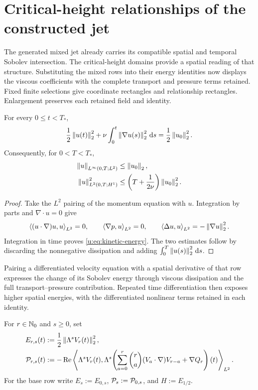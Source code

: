 \section{Critical-height relationships of the constructed jet}
\label{u:sec:compatible-rectangles}

The generated mixed jet already carries its compatible spatial and temporal
Sobolev intersection. The critical-height domains provide a spatial reading
of that structure. Substituting the mixed rows into their energy identities
now displays the viscous coefficients with the complete transport and
pressure terms retained. Fixed finite selections give coordinate rectangles
and relationship rectangles. Enlargement preserves each retained field and
identity.

\begin{proposition}
\label{u:prop:kinetic-energy}
For every \(0\le t<T_*\),
\begin{equation}
 \frac12\left\lVert u(t)\right\rVert_2^2
 +\nu\int_0^t\left\lVert \nabla u(s)\right\rVert_2^2\,\mathrm d s
 =\frac12\left\lVert u_0\right\rVert_2^2.
 \label{u:eq:kinetic-energy}
\end{equation}
Consequently, for \(0<T<T_*\),
\begin{align}
 \left\lVert u\right\rVert_{L^\infty(0,T;L^2)}&\le\left\lVert u_0\right\rVert_2,
 \label{u:eq:energy-Linf}\\
 \left\lVert u\right\rVert_{L^2(0,T;H^1)}^2
 &\le\left(T+\frac1{2\nu}\right)\left\lVert u_0\right\rVert_2^2.
 \label{u:eq:energy-L2H1}
\end{align}
\end{proposition}

\begin{proof}
Take the \(L^2\) pairing of the momentum equation with \(u\).  Integration
by parts and \(\nabla\cdot u=0\) give
\[
 \left\langle (u\cdot\nabla)u,u\right\rangle_{L^2}=0,
 \qquad
 \left\langle \nabla p,u\right\rangle_{L^2}=0,
 \qquad
 \left\langle \Delta u,u\right\rangle_{L^2}=-\left\lVert \nabla u\right\rVert_2^2.
\]
Integration in time proves \eqref{u:eq:kinetic-energy}.  The two estimates
follow by discarding the nonnegative dissipation and adding
\(\int_0^T\left\lVert u(s)\right\rVert_2^2\,\mathrm d s\).
\end{proof}

Pairing a differentiated velocity equation with a spatial derivative of
that row expresses the change of its Sobolev energy through viscous
dissipation and the full transport--pressure contribution.  Repeated time
differentiation then exposes higher spatial energies, with the differentiated
nonlinear terms retained in each identity.

\begin{definition}
\label{u:def:critical-height-rows}
For \(r\in\mathbb N_0\) and \(s\ge0\), set
\begin{align}
 E_{r,s}(t)&:=\frac12\left\lVert \Lambda^sV_r(t)\right\rVert_2^2,
 \label{u:eq:temporal-row-spatial-energy}\\
 \mathcal P_{r,s}(t)&:=-\operatorname{Re}
 \left\langle \Lambda^sV_r(t),\Lambda^s\!\left(
   \sum_{a=0}^{r}\binom ra(V_a\cdot\nabla)V_{r-a}+\nabla Q_r
 \right)(t)\right\rangle_{L^2}.
 \label{u:eq:temporal-row-pressure-complete-transfer}
\end{align}
For the base row write \(E_s:=E_{0,s}\), \(\mathcal P_s:=\mathcal P_{0,s}\), and
\(H:=E_{1/2}\).
\end{definition}

